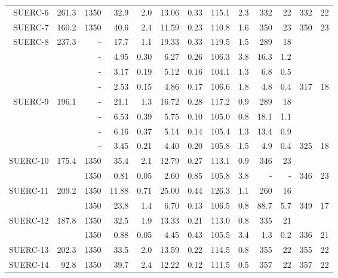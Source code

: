 \documentclass[authoryear,review,12pt]{elsarticle}
\begin{document}
\begin{table}
\begin{tabular}{|r|rrrrrrrrrrrr|}
    SUERC-6 & 261.3 & 1350  & 32.9  & 2.0   & 13.06 & 0.33  & 115.1 & 2.3   & 332   & 22    & 332   & 22 \\
    SUERC-7 & 160.2 & 1350  & 40.6  & 2.4   & 11.59 & 0.23  & 110.8 & 1.6   & 350   & 23    & 350   & 23 \\
    SUERC-8 & 237.3 & -     & 17.7  & 1.1   & 19.33 & 0.33  & 119.5 & 1.5   & 289   & 18    &       &  \\
          &       & -     & 4.95  & 0.30  & 6.27  & 0.26  & 106.3 & 3.8   & 16.3  & 1.2   &       &  \\
          &       & -     & 3.17  & 0.19  & 5.12  & 0.16  & 104.1 & 1.3   & 6.8   & 0.5   &       &  \\
          &       & -     & 2.53  & 0.15  & 4.86  & 0.17  & 106.6 & 1.8   & 4.8   & 0.4   & 317   & 18 \\
    SUERC-9 & 196.1 & -     & 21.1  & 1.3   & 16.72 & 0.28  & 117.2 & 0.9   & 289   & 18    &       &  \\
          &       & -     & 6.53  & 0.39  & 5.75  & 0.10  & 105.0 & 0.8   & 18.1  & 1.1   &       &  \\
          &       & -     & 6.16  & 0.37  & 5.14  & 0.14  & 105.4 & 1.3   & 13.4  & 0.9   &       &  \\
          &       & -     & 3.45  & 0.21  & 4.40  & 0.20  & 105.8 & 1.5   & 4.9   & 0.4   & 325   & 18 \\
    SUERC-10 & 175.4 & 1350  & 35.4  & 2.1   & 12.79 & 0.27  & 113.1 & 0.9   & 346   & 23    &       &  \\
          &       & 1350  & 0.81  & 0.05  & 2.60  & 0.85  & 105.8 & 3.8   & -   & -     & 346   & 23 \\
    SUERC-11 & 209.2 & 1350  & 11.88 & 0.71  & 25.00 & 0.44  & 126.3 & 1.1   & 260   & 16    &       &  \\
          &       & 1350  & 23.8  & 1.4   & 6.70  & 0.13  & 106.5 & 0.8   & 88.7  & 5.7   & 349   & 17 \\
    SUERC-12 & 187.8 & 1350  & 32.5  & 1.9   & 13.33 & 0.21  & 113.0 & 0.8   & 335   & 21    &       &  \\
          &       & 1350  & 0.88  & 0.05  & 4.45  & 0.43  & 105.5 & 3.4   & 1.3   & 0.2   & 336   & 21 \\
    SUERC-13 & 202.3 & 1350  & 33.5  & 2.0   & 13.59 & 0.22  & 114.5 & 0.8   & 355   & 22    & 355   & 22 \\
    SUERC-14 & 92.8  & 1350  & 39.7  & 2.4   & 12.22 & 0.12  & 111.5 & 0.5   & 357   & 22    & 357   & 22 \\

\end{tabular}
\end{table}
\end{document}
